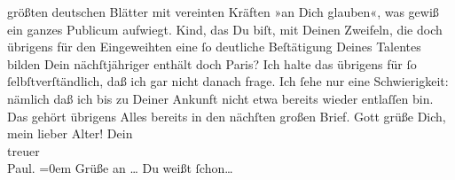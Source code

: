 \begin{ledgroupsized}[t]{13cm}
               größten deutschen Blätter mit vereinten Kräften »an Dich glauben«, was gewiß ein ganzes Publicum
               aufwiegt. Kind, das Du biſt, mit Deinen Zweifeln, die doch übrigens für den
               Eingeweihten eine ſo deutliche Beſtätigung Deines Talentes bilden{\dotsfour}\pend
           \pstart
           {\pb}Dein nächſtjähriger \label{K_L02671-2v}\label{K_L02671-2h} enthält doch Paris? Ich
               halte das übrigens für ſo ſelbſtverſtändlich, daß ich gar nicht danach frage. Ich
               ſehe nur eine Schwierigkeit: nämlich daß ich bis zu Deiner Ankunft nicht etwa bereits
               wieder entlaſſen bin.\pend
           \pstart
           Das gehört übrigens Alles bereits in den nächſten großen Brief. Gott grüße Dich, mein
               lieber Alter!\pend
           \pstart
           Dein {\\[\baselineskip]}treuer {\\[\baselineskip]}\spacefill\mbox{Paul.}\pend
           \leftskip=0em{}\pstart
           \noindent{}Grüße an {\dots}{ } Du weißt ſchon{\dots}\pend
           \endnumbering{}\end{ledgroupsized}  \newcommand{\dateiname}{L02671}\newcommand{\titel}{Paul Goldmann an Arthur Schnitzler, 22. 11. [1891]}\newcommand{\editorInnen}{Martin Anton Müller und Laura Untner}
      